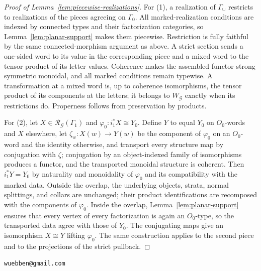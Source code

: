 \documentclass[11pt,letterpaper,twoside]{article}
\theoremstyle{plain}
\theoremstyle{definition}
\theoremstyle{remark}
\begin{document}
\begin{proof}[Proof of Lemma~\ref{lem:piecewise-realizations}]
For (1), a realization of \(\Gamma_\cup\) restricts to realizations of the pieces agreeing on \(\Gamma_0\).  All marked-realization conditions are indexed by connected types and their factorization categories, so Lemma~\ref{lem:planar-support} makes them piecewise.  Restriction is fully faithful by the same connected-morphism argument as above.  A strict section sends a one-sided word to its value in the corresponding piece and a mixed word to the tensor product of its letter values.  Coherence makes the assembled functor strong symmetric monoidal, and all marked conditions remain typewise.  A transformation at a mixed word is, up to coherence isomorphisms, the tensor product of its components at the letters; it belongs to \(W_{\mathcal G}\) exactly when its restrictions do.  Properness follows from preservation by products.

For (2), let \(X\in\mathcal R_{\mathcal G}(\Gamma_1)\) and \(\varphi_0:i_1^*X\cong Y_0\).  Define \(Y\) to equal \(Y_0\) on \(O_0\)-words and \(X\) elsewhere, let \(\zeta_w:X(w)\to Y(w)\) be the component of \(\varphi_0\) on an \(O_0\)-word and the identity otherwise, and transport every structure map by conjugation with \(\zeta\); conjugation by an object-indexed family of isomorphisms produces a functor, and the transported monoidal structure is coherent.  Then \(i_1^*Y=Y_0\) by naturality and monoidality of \(\varphi_0\) and its compatibility with the marked data.  Outside the overlap, the underlying objects, strata, normal splittings, and collars are unchanged; their product identifications are recomposed with the components of \(\varphi_0\).  Inside the overlap, Lemma~\ref{lem:planar-support} ensures that every vertex of every factorization is again an \(O_0\)-type, so the transported data agree with those of \(Y_0\).  The conjugating maps give an isomorphism \(X\cong Y\) lifting \(\varphi_0\).  The same construction applies to the second piece and to the projections of the strict pullback.
\end{proof}

\bigskip
{} \texttt{wuebben@gmail.com}



\end{document}
